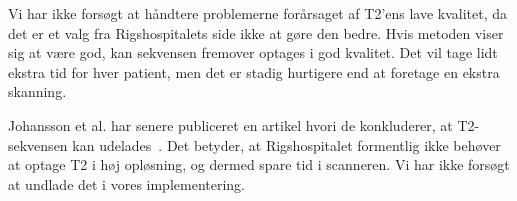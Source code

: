 Vi har ikke forsøgt at håndtere problemerne forårsaget af T2’ens lave kvalitet, da det er et valg fra Rigshospitalets side ikke at gøre den bedre. Hvis metoden viser sig at være god, kan sekvensen fremover optages i god kvalitet. Det vil tage lidt ekstra tid for hver patient, men det er stadig hurtigere end at foretage en ekstra skanning.

Johansson et al. har senere publiceret en artikel hvori de konkluderer, at T2-sekvensen kan udelades~\cite{bettersCT}.  Det betyder, at Rigshospitalet formentlig ikke behøver at optage T2 i høj opløsning, og dermed spare tid i scanneren. Vi har ikke forsøgt at undlade det i vores implementering.
